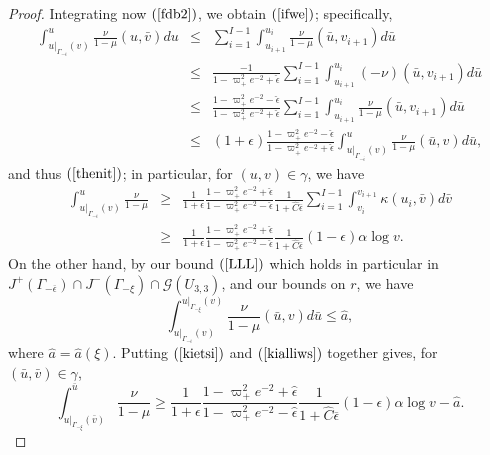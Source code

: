 \documentclass{article}
\begin{document}
{\begin{proof}
Integrating now $(\ref{fdb2})$, we obtain $(\ref{ifwe})$;
specifically,
\begin{eqnarray*}
\int_{u|_{\Gamma_{-\overline\epsilon}}(v)}^u
\frac{\nu}{1-\mu}(u,\bar{v})du&\le&
\sum_{i=1}^{I-1}\int_{u_{i+1}}^{u_i}\frac\nu{1-\mu}(\bar{u},v_{i+1}) d\bar{u}\\
&\le&
\frac{-1}
{1-\varpi_+^2e^{-2}+\hat{\epsilon}}
\sum_{i=1}^{I-1}\int_{u_{i+1}}^{u_i}(-\nu)(\bar{u},v_{i+1}) d\bar{u}\\
&\le&\frac{1-\varpi_+^2e^{-2}-\hat{\epsilon}}
{1-\varpi_+^2e^{-2}+\hat{\epsilon}}
\sum_{i=1}^{I-1}\int_{u_{i+1}}^{u_i}\frac{\nu}{1-\mu}(\bar{u},v_{i+1}) d\bar{u}\\
&\le&(1+\epsilon)
\frac{1-\varpi_+^2e^{-2}-\hat{\epsilon}}
{1-\varpi_+^2e^{-2}+\hat{\epsilon}}
\int_{u|_{\Gamma_{-\overline\epsilon}}(v)}^{u}
\frac{\nu}{1-\mu}(\bar{u},v)d\bar{u},
\end{eqnarray*}
and thus
$(\ref{thenit})$;
in particular, for $(u,v)\in\gamma$, we have
\begin{eqnarray}
\label{kietsi}
\nonumber
\int_{u|_{\Gamma_{-\overline\epsilon}}(v)}^u
\frac{\nu}{1-\mu}&\ge&
\frac{1}{1+\epsilon}
\frac{1-\varpi_+^2e^{-2}+\hat{\epsilon}}
{1-\varpi_+^2e^{-2}-\hat{\epsilon}}
\frac{1}{1+\hat{C}\overline\epsilon}\sum_{i=1}^{I-1}\int_{v_i}^{v_{i+1}}\kappa
(u_i,\bar{v}) d\bar{v}\\
&\ge&
\frac{1}{1+\epsilon}
\frac{1-\varpi_+^2e^{-2}+\hat{\epsilon}}
{1-\varpi_+^2e^{-2}-\hat{\epsilon}}
\frac{1}{1+\hat{C}\overline\epsilon}(1-\epsilon)\alpha\log{v}.
\end{eqnarray}
On the other hand,
by our bound $(\ref{LLL})$ which holds in
particular in 
$J^+(\Gamma_{-\overline{\epsilon}})\cap
J^-(\Gamma_{-\xi})\cap\mathcal{G}(U_{3,3})$,
and our bounds on $r$, we have
\begin{equation}
\label{kialliws}
\int_{u|_{\Gamma_{-\overline\epsilon}}(v)}^
{u|_{\Gamma_{-\xi}}(v)}
\frac{\nu}{1-\mu}(\bar{u},v)d\bar{u}
\le\hat{a},
\end{equation}
where $\hat{a}=\hat{a}(\xi)$.
Putting $(\ref{kietsi})$ and $(\ref{kialliws})$ together
gives, for $(\bar{u},\bar{v})\in\gamma$,
\begin{equation}
\label{autoeivai}
\int_{u|_{\Gamma_{-\xi}}(\bar{v})}^{\bar{u}}
\frac{\nu}{1-\mu}\ge
\frac{1}{1+\epsilon}
\frac{1-\varpi_+^2e^{-2}+\hat{\epsilon}}
{1-\varpi_+^2e^{-2}-\hat{\epsilon}}
\frac{1}{1+\hat{C}\overline\epsilon}(1-\epsilon)\alpha\log{v}-\hat{a}.
\end{equation}


\end{proof}}
\end{document}
